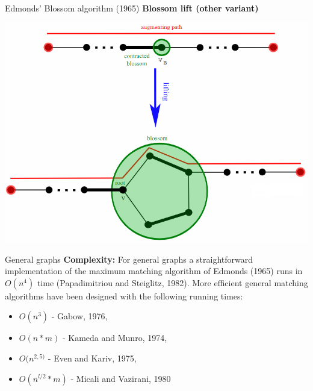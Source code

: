 \begin{frame}[t]{Edmonds' Blossom algorithm (1965)}
	\textbf{Blossom lift (other variant)}
	
	\begin{center}
		\includegraphics[width=0.75\linewidth]{img/general/Edmonds_blossom_lift2.png}
	\end{center}
\end{frame}

\begin{frame}[t]{General graphs}	
	\textbf{Complexity:} 
	For general graphs a straightforward implementation of the maximum matching algorithm of Edmonds (1965) runs in $O(n^4)$ time (Papadimitriou and Steiglitz, 1982). More efficient 	general matching algorithms have been designed with the following running times:
	\begin{itemize}	
		\item $O(n^3)$ - Gabow, 1976,
		\item $O(n * m)$ - Kameda and Munro, 1974,
		\item $O(n^{2,5)}$ - Even and Kariv, 1975,
		\item $O(n^{l/2}*m)$ - Micali and Vazirani, 1980
	\end{itemize}
	
\end{frame}